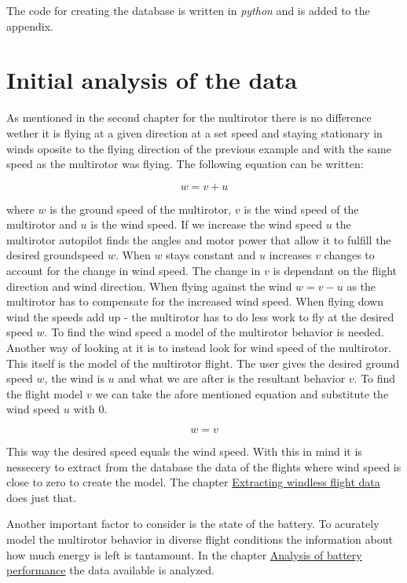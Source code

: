 \documentclass[12pt,oneside]{reedthesis}
\theoremstyle{definition}
\theoremstyle{definition}
\theoremstyle{definition}
\theoremstyle{remark}
\begin{document}
The code for creating the database is written in \emph{python} and is
added to the appendix.

\chapter{Initial analysis of the
data}\label{initial-analysis-of-the-data}

As mentioned in the second chapter for the multirotor there is no
difference wether it is flying at a given direction at a set speed and
staying stationary in winds oposite to the flying direction of the
previous example and with the same speed as the multirotor was flying.
The following equation can be written:

\[w = v + u\]

where \(w\) is the ground speed of the multirotor, \(v\) is the wind
speed of the multirotor and \(u\) is the wind speed. If we increase the
wind speed \(u\) the multirotor autopilot finds the angles and motor
power that allow it to fulfill the desired groundspeed \(w\). When \(w\)
stays constant and \(u\) increases \(v\) changes to account for the
change in wind speed. The change in \(v\) is dependant on the flight
direction and wind direction. When flying against the wind \(w = v - u\)
as the multirotor has to compensate for the increased wind speed. When
flying down wind the speeds add up - the multirotor has to do less work
to fly at the desired speed \(w\). To find the wind speed a model of the
multirotor behavior is needed. Another way of looking at it is to
instead look for wind speed of the multirotor. This itself is the model
of the multirotor flight. The user gives the desired ground speed \(w\),
the wind is \(u\) and what we are after is the resultant behavior \(v\).
To find the flight model \(v\) we can take the afore mentioned equation
and substitute the wind speed \(u\) with 0.

\[w = v\]

This way the desired speed equals the wind speed. With this in mind it
is nessecery to extract from the database the data of the flights where
wind speed is close to zero to create the model. The chapter
\protect\hyperlink{extracting-windless-flight-data}{Extracting windless
flight data} does just that.

Another important factor to consider is the state of the battery. To
acurately model the multirotor behavior in diverse flight conditions the
information about how much energy is left is tantamount. In the chapter
\protect\hyperlink{analysis-of-battery-performance}{Analysis of battery
performance} the data available is analyzed.
\end{document}
